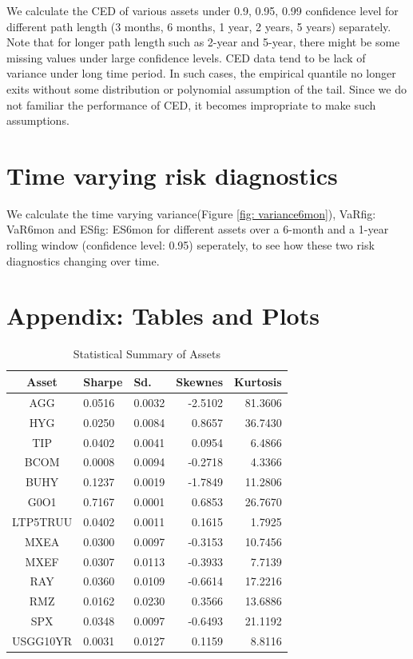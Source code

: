 \documentclass[12pt]{article}
\begin{document}
We calculate the CED of various assets under 0.9, 0.95, 0.99 confidence level for different path length (3 months, 6 months, 1 year, 2 years, 5 years) separately. Note that for longer path length such as 2-year and 5-year, there might be some missing values under large confidence levels. CED data tend to be lack of variance under long time period. In such cases, the empirical quantile no longer exits without some distribution or polynomial assumption of the tail. Since we do not familiar the performance of CED, it becomes impropriate to make such assumptions.

\section{Time varying risk diagnostics}

We calculate the time varying variance(Figure \ref{fig: variance6mon}), VaR{fig: VaR6mon} and ES{fig: ES6mon}  for different assets over a 6-month and a 1-year rolling window (confidence level: 0.95) seperately, to see how these two risk diagnostics changing over time. 


\section{Appendix: Tables and Plots}


\begin{table}[!h]
\caption{Statistical Summary of Assets} %
\centering 
\begin{tabular}{ | c || p{1.5cm} p{1.5cm} r r | } 
 \hline
Asset & Sharpe  & Sd. & Skewnes & Kurtosis \\
  \hline \hline
AGG & 0.0516 & 0.0032 & -2.5102 & 81.3606\\ 
HYG & 0.0250 & 0.0084 &  0.8657 & 36.7430\\ 
TIP & 0.0402 & 0.0041 &  0.0954 &  6.4866\\ 
BCOM & 0.0008 & 0.0094 & -0.2718 &  4.3366\\ 
BUHY & 0.1237 & 0.0019 & -1.7849 & 11.2806\\ 
G0O1 & 0.7167 & 0.0001 &  0.6853 & 26.7670\\ 
LTP5TRUU & 0.0402 & 0.0011 &  0.1615 &  1.7925\\ 
MXEA & 0.0300 & 0.0097 & -0.3153 & 10.7456\\ 
MXEF & 0.0307 & 0.0113 & -0.3933 &  7.7139\\ 
RAY & 0.0360 & 0.0109 & -0.6614 & 17.2216\\ 
RMZ & 0.0162 & 0.0230 &  0.3566 & 13.6886\\ 
SPX & 0.0348 & 0.0097 & -0.6493 & 21.1192\\ 
USGG10YR & 0.0031 & 0.0127 &  0.1159 &  8.8116 \\
 \hline
\end{tabular}
\label{table:statSum}
\end{table}
\end{document}
